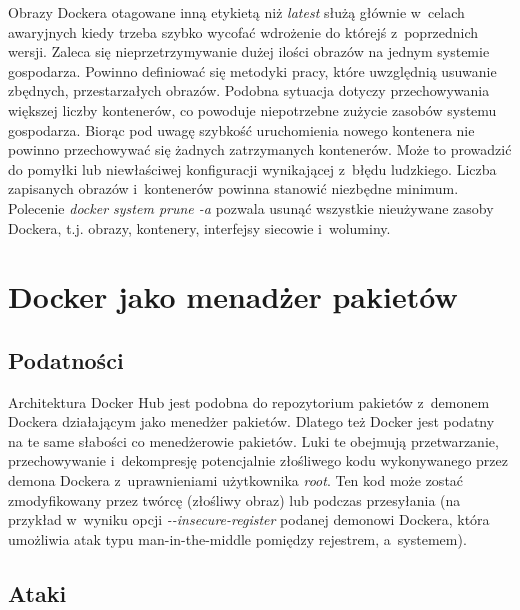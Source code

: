 Obrazy Dockera otagowane inną etykietą niż \textit{latest} służą głównie w~celach awaryjnych kiedy trzeba szybko wycofać wdrożenie do którejś z~poprzednich wersji. Zaleca się nieprzetrzymywanie dużej ilości obrazów na jednym systemie gospodarza. Powinno definiować się metodyki pracy, które uwzględnią usuwanie zbędnych, przestarzałych obrazów. Podobna sytuacja dotyczy przechowywania większej liczby kontenerów, co powoduje niepotrzebne zużycie zasobów systemu gospodarza. Biorąc pod uwagę szybkość uruchomienia nowego kontenera nie powinno przechowywać się żadnych zatrzymanych kontenerów. Może to prowadzić do pomyłki lub niewłaściwej konfiguracji wynikającej z~błędu ludzkiego. Liczba zapisanych obrazów i~kontenerów powinna stanowić niezbędne minimum. Polecenie \textit{docker system prune -a} pozwala usunąć wszystkie nieużywane zasoby Dockera, t.j. obrazy, kontenery, interfejsy siecowie i~woluminy.

\section{Docker jako menadżer pakietów}

\subsection{Podatności}

Architektura Docker Hub jest podobna do repozytorium pakietów z~demonem Dockera działającym jako menedżer pakietów. Dlatego też Docker jest podatny na te same słabości co menedżerowie pakietów. Luki te obejmują przetwarzanie, przechowywanie i~dekompresję potencjalnie złośliwego kodu wykonywanego przez demona Dockera z~uprawnieniami użytkownika \textit{root}. Ten kod może zostać zmodyfikowany przez twórcę (złośliwy obraz) lub podczas przesyłania (na przykład w~wyniku opcji \textit{-{}-insecure-register} podanej demonowi Dockera, która umożliwia atak typu man-in-the-middle pomiędzy rejestrem, a~systemem).

\subsection{Ataki}

